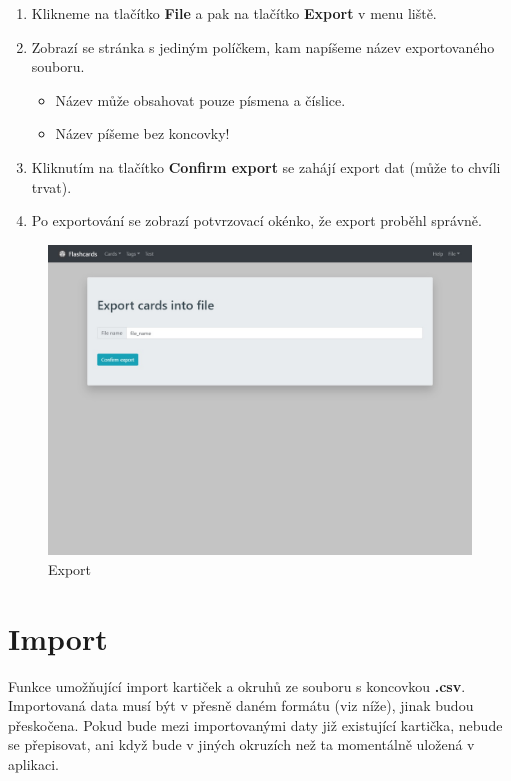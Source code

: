 \documentclass[11pt]{article}
\providecommand{\tightlist}{\setlength{\itemsep}{1pt}\setlength{\parskip}{1pt}}
\begin{document}
\begin{enumerate}
\def\labelenumi{\arabic{enumi}.}
\tightlist
\item
  Klikneme na tlačítko \textbf{File} a pak na tlačítko \textbf{Export} v
  menu liště.
\item
  Zobrazí se stránka s jediným políčkem, kam napíšeme název
  exportovaného souboru.

  \begin{itemize}
  \tightlist
  \item
    Název může obsahovat pouze písmena a číslice.
  \item
    Název píšeme bez koncovky!
  \end{itemize}
\item
  Kliknutím na tlačítko \textbf{Confirm export} se zahájí export dat
  (může to chvíli trvat).
\item
  Po exportování se zobrazí potvrzovací okénko, že export proběhl
  správně.
\end{enumerate}

\begin{figure}
\centering
\includegraphics{assets/export.jpg}
\caption{Export}
\end{figure}

\hypertarget{import}{%
\section{Import}\label{import}}

Funkce umožňující import kartiček a okruhů ze souboru s koncovkou
\textbf{.csv}. Importovaná data musí být v přesně daném formátu (viz
níže), jinak budou přeskočena. Pokud bude mezi importovanými daty již
existující kartička, nebude se přepisovat, ani když bude v jiných
okruzích než ta momentálně uložená v aplikaci.
\end{document}
